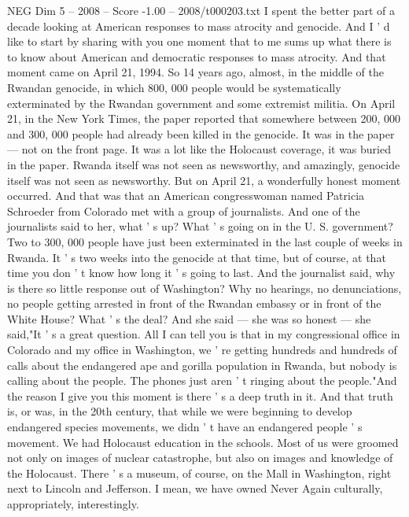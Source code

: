 \begin{textsample}{NEG Dim 5 – 2008 – Score -1.00 – 2008/t000203.txt}  \label{ex:f5_neg_067}
I spent the better part of a decade looking at American responses to mass atrocity and genocide.
And I ' d like to start by sharing with you one moment that to me sums up what there is to know about American and democratic responses to mass atrocity.
And that moment came on April 21, 1994.
So 14 years ago, almost, in the middle of the Rwandan genocide, in which 800, 000 people would be systematically exterminated by the Rwandan government and some extremist militia.
On April 21, in the New York Times, the paper reported that somewhere between 200, 000 and 300, 000 people had already been killed in the genocide.
It was in the paper — not on the front page.
It was a lot like the Holocaust coverage, it was buried in the paper.
Rwanda itself was not seen as newsworthy, and amazingly, genocide itself was not seen as newsworthy.
But on April 21, a wonderfully honest moment occurred.
And that was that an American congresswoman named Patricia Schroeder from Colorado met with a group of journalists.
And one of the journalists said to her, what ' s up?
What ' s going on in the U.
S. government?
Two to 300, 000 people have just been exterminated in the last couple of weeks in Rwanda.
It ' s two weeks into the genocide at that time, but of course, at that time you don ' t know how long it ' s going to last.
And the journalist said, why is there so little response out of Washington?
Why no hearings, no denunciations, no people getting arrested in front of the Rwandan embassy or in front of the White House?
What ' s the deal?
And she said — she was so honest — she said,"It ' s a great question.
All I can tell you is that in my congressional office in Colorado and my office in Washington, we ' re getting hundreds and hundreds of calls about the endangered ape and gorilla population in Rwanda, but nobody is calling about the people.
The phones just aren ' t ringing about the people."And the reason I give you this moment is there ' s a deep truth in it.
And that truth is, or was, in the 20th century, that while we were beginning to develop endangered species movements, we didn ' t have an endangered people ' s movement.
We had Holocaust education in the schools.
Most of us were groomed not only on images of nuclear catastrophe, but also on images and knowledge of the Holocaust.
There ' s a museum, of course, on the Mall in Washington, right next to Lincoln and Jefferson.
I mean, we have owned Never Again culturally, appropriately, interestingly.

\end{textsample}
